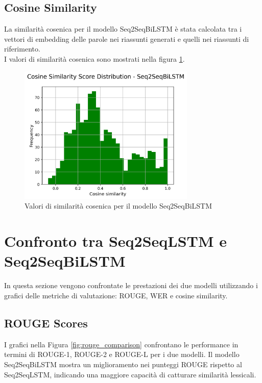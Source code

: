 \documentclass[a4paper, 12pt]{article}
\begin{document}
\subsection{Cosine Similarity}
La similarità cosenica per il modello Seq2SeqBiLSTM è stata calcolata tra i vettori di embedding delle parole nei riassunti generati e quelli nei riassunti di riferimento.\\
I valori di similarità cosenica sono mostrati nella figura \ref{fig:biLSTM_cosine_similarity}.

\begin{figure}[H]
    \centering
    \includegraphics[width=0.75\textwidth]{media/Seq2SeqBiLSTM_cosine_similarity_scores.png}
    \caption{Valori di similarità cosenica per il modello Seq2SeqBiLSTM}
    \label{fig:biLSTM_cosine_similarity}
\end{figure}

\section{Confronto tra Seq2SeqLSTM e Seq2SeqBiLSTM}
In questa sezione vengono confrontate le prestazioni dei due modelli utilizzando i grafici delle metriche di valutazione: ROUGE, WER e cosine similarity.

\subsection{ROUGE Scores}
I grafici nella Figura \ref{fig:rouge_comparison} confrontano le performance in termini di ROUGE-1, ROUGE-2 e ROUGE-L per i due modelli. Il modello Seq2SeqBiLSTM mostra un miglioramento nei punteggi ROUGE rispetto al Seq2SeqLSTM, indicando una maggiore capacità di catturare similarità lessicali.
\end{document}
